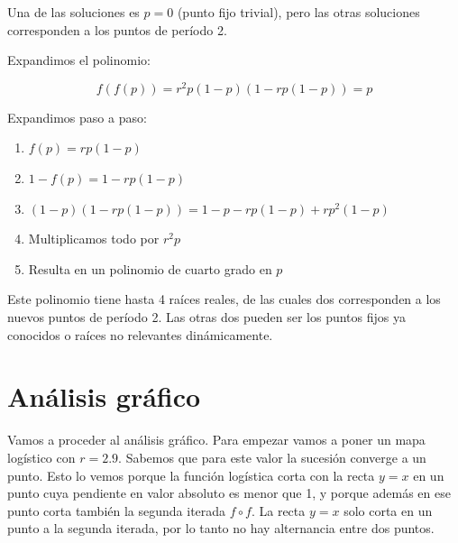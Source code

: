 \documentclass[
  10pt,
  a4paper,
  DIV=11,
  numbers=noendperiod,
  open=any]{scrreprt}
\providecommand{\tightlist}{%
  \setlength{\itemsep}{0pt}\setlength{\parskip}{0pt}}
\numberwithin{equation}{chapter}
\numberwithin{equation}{chapter}
\renewcommand{\[}{\begin{equation}}
\renewcommand{\]}{\end{equation}}
\begin{document}
Una de las soluciones es \(p = 0\) (punto fijo trivial), pero las otras
soluciones corresponden a los puntos de período 2.

Expandimos el polinomio:

\begin{equation}

f(f(p)) = r^2 p (1 - p)(1 - r p (1 - p)) = p

\end{equation}

Expandimos paso a paso:

\begin{enumerate}
\def\labelenumi{\arabic{enumi}.}
\tightlist
\item
  \(f(p) = r p (1 - p)\)\\
\item
  \(1 - f(p) = 1 - r p (1 - p)\)\\
\item
  \((1 - p)(1 - r p (1 - p)) = 1 - p - r p (1 - p) + r p^2 (1 - p)\)\\
\item
  Multiplicamos todo por \(r^2 p\)\\
\item
  Resulta en un polinomio de cuarto grado en \(p\)
\end{enumerate}

Este polinomio tiene hasta 4 raíces reales, de las cuales dos
corresponden a los nuevos puntos de período 2. Las otras dos pueden ser
los puntos fijos ya conocidos o raíces no relevantes dinámicamente.

\section{Análisis gráfico}\label{anuxe1lisis-gruxe1fico}

Vamos a proceder al análisis gráfico. Para empezar vamos a poner un mapa
logístico con \(r=2.9\). Sabemos que para este valor la sucesión
converge a un punto. Esto lo vemos porque la función logística corta con
la recta \(y=x\) en un punto cuya pendiente en valor absoluto es menor
que 1, y porque además en ese punto corta también la segunda iterada
\(f \circ f\). La recta \(y=x\) solo corta en un punto a la segunda
iterada, por lo tanto no hay alternancia entre dos puntos.
\end{document}
